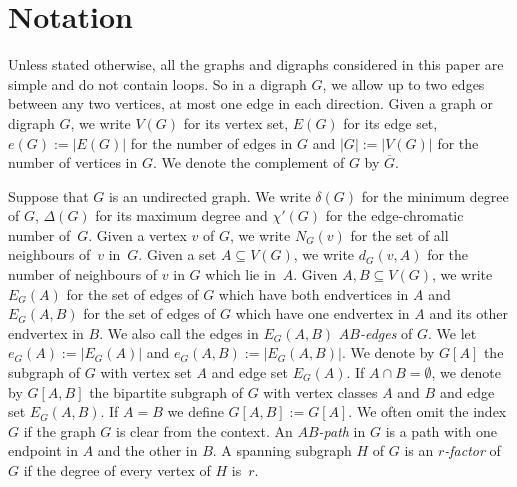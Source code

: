 \documentclass{memo-l}
\numberwithin{section}{chapter}
\numberwithin{equation}{section}
\numberwithin{firstthm}{section}
\numberwithin{figure}{section}
\begin{document}
\section{Notation}\label{notation}

Unless stated otherwise, all the graphs and digraphs considered in this paper are simple and do not contain loops. So in a digraph $G$, we allow up to
two edges between any two vertices, at most one edge in each direction.
Given a graph or digraph $G$, we write $V(G)$ for its vertex set, $E(G)$ for its edge set, $e(G):=|E(G)|$ for
the number of edges in $G$ and $|G|:=|V(G)|$ for the number of vertices in $G$. We denote the complement
of $G$ by $\overline{G}$.

Suppose that $G$ is an undirected graph. We write $\delta(G)$ for the minimum degree of $G$, $\Delta(G)$ for its maximum degree
and $\chi'(G)$ for the edge-chromatic number of~$G$.
Given a vertex $v$ of $G$, we write $N_G(v)$ for the set of all neighbours of~$v$ in~$G$.
Given  a set $A\subseteq V(G)$,
we write $d_G(v,A)$ for the number of  neighbours of $v$ in $G$ which lie in~$A$. Given $A,B\subseteq V(G)$,
we write $E_G(A)$ for the set of  edges of $G$ which have both endvertices in $A$ and $E_G(A,B)$ for the set of
 edges of $G$ which have one endvertex in $A$ and its other endvertex in $B$. We also call the edges in $E_G(A,B)$
\emph{$AB$-edges} of $G$. We let $e_G(A):=|E_G(A)|$ and $e_G(A,B):=|E_G(A,B)|$.
We denote by $G[A]$ the subgraph of $G$ with vertex set $A$ and edge set $E_G(A)$.
If $A\cap B=\emptyset$, we denote by $G[A,B]$ the bipartite subgraph of $G$
with vertex classes $A$ and $B$ and edge set $E_G(A,B)$. 
If $A=B$ we
 define $G[A,B]:=G[A]$.
 We often omit the index $G$ if the graph $G$ is clear from the context.
An \emph{$AB$-path} in $G$ is a path with one endpoint in $A$ and the other in $B$.
A spanning subgraph $H$ of $G$ is an \emph{$r$-factor} of $G$ if the degree of every vertex of $H$ is~$r$.
\end{document}

